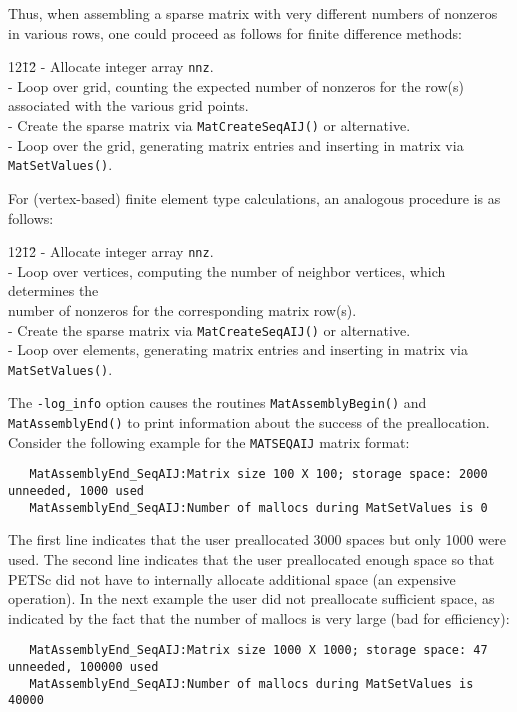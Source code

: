 Thus, when assembling a sparse matrix with very different
numbers of nonzeros in various rows, one could proceed 
as follows for finite difference methods:
\begin{tabbing}
12\=12\= \kill
    \> - Allocate integer array {\tt nnz}.\\
    \> - Loop over grid, counting the expected number of nonzeros for the row(s)\\
    \>\>  associated with the various grid points.\\
    \> - Create the sparse matrix via {\tt MatCreateSeqAIJ()} or alternative.\\
    \> - Loop over the grid, generating matrix entries and inserting 
      in matrix via {\tt MatSetValues()}.\\
  \end{tabbing}
\vspace{-0.2in}
For (vertex-based) finite element type calculations, an analogous procedure is as follows:
  \begin{tabbing}
12\=12\= \kill
    \> - Allocate integer array {\tt nnz}.\\
    \>- Loop over vertices, computing the number of neighbor vertices, which determines the\\
    \>\> number of nonzeros for the corresponding matrix row(s).\\
    \> - Create the sparse matrix via {\tt MatCreateSeqAIJ()} or alternative.\\
    \> - Loop over elements, generating matrix entries and inserting
      in matrix via {\tt MatSetValues()}.\\
  \end{tabbing}

The {\tt -log\_info}  option causes the routines
{\tt MatAssemblyBegin()} and {\tt MatAssemblyEnd()} to print
information about the success of the preallocation.  Consider the
following example for the {\tt MATSEQAIJ} matrix format:
\begin{verbatim}
   MatAssemblyEnd_SeqAIJ:Matrix size 100 X 100; storage space: 2000 unneeded, 1000 used
   MatAssemblyEnd_SeqAIJ:Number of mallocs during MatSetValues is 0
\end{verbatim}
The first line indicates that the user preallocated 3000 spaces but only
1000 were used. The second line indicates that the user preallocated
enough space so that PETSc did not have to internally allocate additional
space (an expensive operation).  In the next example the user did not
preallocate sufficient space, as indicated by the fact that the number
of mallocs is very large (bad for efficiency):
\begin{verbatim}
   MatAssemblyEnd_SeqAIJ:Matrix size 1000 X 1000; storage space: 47 unneeded, 100000 used
   MatAssemblyEnd_SeqAIJ:Number of mallocs during MatSetValues is 40000
\end{verbatim}
 
